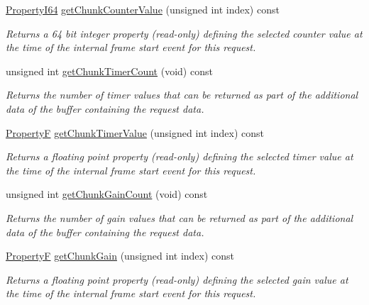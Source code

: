 \begin{DoxyCompactItemize}
\hyperlink{group___common_interface_ga81749b2696755513663492664a18a893}{Property\+I64} \hyperlink{classmv_i_m_p_a_c_t_1_1acquire_1_1_request_a07d7edad7cdae47d16de0356ebb2e42e}{get\+Chunk\+Counter\+Value} (unsigned int index) const 
\begin{DoxyCompactList}\small\item\em Returns a 64 bit integer property {\bfseries }(read-\/only) defining the selected counter value at the time of the internal frame start event for this request. \end{DoxyCompactList}\item 
unsigned int \hyperlink{classmv_i_m_p_a_c_t_1_1acquire_1_1_request_ad6458f69adbeb566126db8fbda2e84df}{get\+Chunk\+Timer\+Count} (void) const 
\begin{DoxyCompactList}\small\item\em Returns the number of timer values that can be returned as part of the additional data of the buffer containing the request data. \end{DoxyCompactList}\item 
\hyperlink{group___common_interface_gaf54865fe5a3d5cfd15f9a111b40d09f9}{Property\+F} \hyperlink{classmv_i_m_p_a_c_t_1_1acquire_1_1_request_a459a1c5b4cdb00df81e73f66b5985557}{get\+Chunk\+Timer\+Value} (unsigned int index) const 
\begin{DoxyCompactList}\small\item\em Returns a floating point property {\bfseries }(read-\/only) defining the selected timer value at the time of the internal frame start event for this request. \end{DoxyCompactList}\item 
unsigned int \hyperlink{classmv_i_m_p_a_c_t_1_1acquire_1_1_request_ae940fe94ee8091d89cf9f4d4e7808c81}{get\+Chunk\+Gain\+Count} (void) const 
\begin{DoxyCompactList}\small\item\em Returns the number of gain values that can be returned as part of the additional data of the buffer containing the request data. \end{DoxyCompactList}\item 
\hyperlink{group___common_interface_gaf54865fe5a3d5cfd15f9a111b40d09f9}{Property\+F} \hyperlink{classmv_i_m_p_a_c_t_1_1acquire_1_1_request_a89d55e162f431703c1dc495de6b34a08}{get\+Chunk\+Gain} (unsigned int index) const 
\begin{DoxyCompactList}\small\item\em Returns a floating point property {\bfseries }(read-\/only) defining the selected gain value at the time of the internal frame start event for this request. \end{DoxyCompactList}\item 

\end{DoxyCompactItemize}
